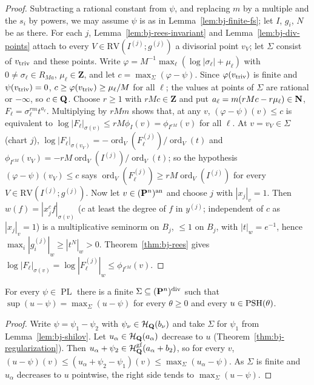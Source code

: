 \begin{proof}
Subtracting a rational constant from $\psi$, and replacing $m$ by a multiple and the $s_i$ by powers, we may
assume $\psi$ is as in Lemma~\ref{lem:bj-finite-fs};
let $I$, $g_i$, $N$ be as there. For each $j$, Lemma~\ref{lem:bj-rees-invariant} and
Lemma~\ref{lem:bj-div-points} attach to every $V\in\mathrm{RV}(I^{(j)};g^{(j)})$ a divisorial point $v_V$;
let $\Sigma$ consist of $v_{\mathrm{triv}}$ and these points. Write $\varphi=M^{-1}\max_\ell(\log|\sigma_\ell|+\mu_\ell)$ with
$0\ne\sigma_\ell\in R_{Ma}$, $\mu_\ell\in\mathbf{Z}$, and let $c=\max_\Sigma(\varphi-\psi)$. Since $\varphi(v_{\mathrm{triv}})$ is
finite and $\psi(v_{\mathrm{triv}})=0$, $c\ge\varphi(v_{\mathrm{triv}})\ge\mu_\ell/M$ for all $\ell$; the values at points of $\Sigma$
are rational or $-\infty$, so $c\in\mathbf{Q}$. Choose $r\ge1$ with $rMc\in\mathbf{Z}$ and put
$a_\ell=m(rMc-r\mu_\ell)\in\mathbf{N}$, $F_\ell=\sigma_\ell^{rm}t^{a_\ell}$. Multiplying by $rMm$ shows that, at any $v$,
$(\varphi-\psi)(v)\le c$ is equivalent to $\log|F_\ell|_{\sigma(v)}\le rM\phi_I(v)=\phi_{I^{rM}}(v)$ for all $\ell$.
At $v=v_V\in\Sigma$ (chart $j$), $\log|F_\ell|_{\sigma(v_V)}=-\operatorname{ord}_V(F_\ell^{(j)})/\operatorname{ord}_V(t)$ and
$\phi_{I^{rM}}(v_V)=-rM\operatorname{ord}_V(I^{(j)})/\operatorname{ord}_V(t)$; so the hypothesis $(\varphi-\psi)(v_V)\le c$ says
$\operatorname{ord}_V(F_\ell^{(j)})\ge rM\operatorname{ord}_V(I^{(j)})$ for every $V\in\mathrm{RV}(I^{(j)};g^{(j)})$. Now let
$v\in(\mathbf{P}^n)^{\mathrm{an}}$ and choose $j$ with $|x_j|_v=1$. Then $w(f)=|x_j^cf|_{\sigma(v)}$ ($c$ at least the degree of $f$ in $y^{(j)}$; independent of $c$ as $|x_j|_v=1$) is a
multiplicative seminorm on $B_j$, $\le1$ on $B_j$, with $|t|_w=e^{-1}$, hence
$\max_i|g_i^{(j)}|_w\ge|t^N|_w>0$. Theorem~\ref{thm:bj-rees} gives
$\log|F_\ell|_{\sigma(v)}=\log|F_\ell^{(j)}|_w\le\phi_{I^{rM}}(v)$.
\end{proof}

\begin{lemma}\label{lem:bj-sup-pl}
\leanok
{}
For every $\psi\in\operatorname{PL}$ there is a finite $\Sigma\subseteq(\mathbf{P}^n)^{\mathrm{div}}$ such that
$\sup(u-\psi)=\max_\Sigma(u-\psi)$ for every $\theta\ge0$ and every $u\in\operatorname{PSH}(\theta)$.
\end{lemma}

\begin{proof}
Write $\psi=\psi_1-\psi_2$ with $\psi_\nu\in\mathcal H_{\mathbf{Q}}(b_\nu)$ and take $\Sigma$ for $\psi_1$ from
Lemma~\ref{lem:bj-shilov}. Let $u_\alpha\in\mathcal H_{\mathbf{Q}}(a_\alpha)$ decrease to $u$
(Theorem~\ref{thm:bj-regularization}). Then $u_\alpha+\psi_2\in\mathcal H^{\mathrm{gf}}_{\mathbf{Q}}(a_\alpha+b_2)$, so for every $v$,
$(u-\psi)(v)\le(u_\alpha+\psi_2-\psi_1)(v)\le\max_\Sigma(u_\alpha-\psi)$. As $\Sigma$ is finite and $u_\alpha$
decreases to $u$ pointwise, the right side tends to $\max_\Sigma(u-\psi)$.
\end{proof}

